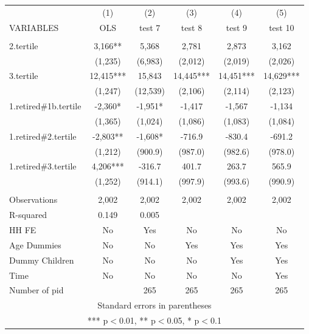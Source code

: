 \begin{tabular}{lccccc} \hline
 & (1) & (2) & (3) & (4) & (5) \\
VARIABLES & OLS & test 7 & test 8 & test 9 & test 10 \\ \hline
 &  &  &  &  &  \\
2.tertile & 3,166** & 5,368 & 2,781 & 2,873 & 3,162 \\
 & (1,235) & (6,983) & (2,012) & (2,019) & (2,026) \\
3.tertile & 12,415*** & 15,843 & 14,445*** & 14,451*** & 14,629*** \\
 & (1,247) & (12,539) & (2,106) & (2,114) & (2,123) \\
1.retired\#1b.tertile & -2,360* & -1,951* & -1,417 & -1,567 & -1,134 \\
 & (1,365) & (1,024) & (1,086) & (1,083) & (1,084) \\
1.retired\#2.tertile & -2,803** & -1,608* & -716.9 & -830.4 & -691.2 \\
 & (1,212) & (900.9) & (987.0) & (982.6) & (978.0) \\
1.retired\#3.tertile & 4,206*** & -316.7 & 401.7 & 263.7 & 565.9 \\
 & (1,252) & (914.1) & (997.9) & (993.6) & (990.9) \\
 &  &  &  &  &  \\
Observations & 2,002 & 2,002 & 2,002 & 2,002 & 2,002 \\
R-squared & 0.149 & 0.005 &  &  &  \\
HH FE & No & Yes & No & No & No \\
Age Dummies & No & No & Yes & Yes & Yes \\
Dummy Children & No & No & No & Yes & Yes \\
Time & No & No & No & No & Yes \\
 Number of pid &  & 265 & 265 & 265 & 265 \\ \hline
\multicolumn{6}{c}{ Standard errors in parentheses} \\
\multicolumn{6}{c}{ *** p$<$0.01, ** p$<$0.05, * p$<$0.1} \\
\end{tabular}
